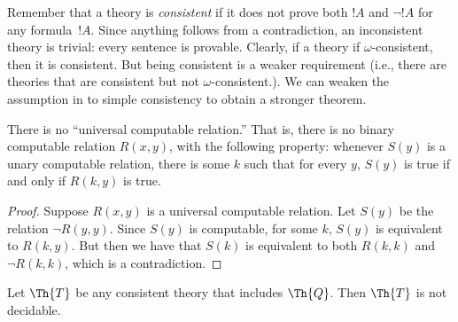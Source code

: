 \documentclass[../../../include/open-logic-section]{subfiles}
\begin{document}

\begin{explain}
Remember that a theory is \emph{consistent} if it does not prove both
$!A$ and $\lnot !A$ for any formula~$!A$. Since anything follows from
a contradiction, an inconsistent theory is trivial: every sentence is
provable. Clearly, if a theory if $\omega$-consistent, then it is
consistent. But being consistent is a weaker requirement (i.e., there
are theories that are consistent but not $\omega$-consistent.). We can
weaken the assumption in  to simple
consistency to obtain a stronger theorem.
\end{explain}

\begin{lem}
There is no ``universal computable relation.'' That is, there is no
binary computable relation $R(x,y)$, with the following property:
whenever $S(y)$ is a unary computable relation, there is some $k$ such
that for every $y$, $S(y)$ is true if and only if $R(k,y)$ is true.
\end{lem}

\begin{proof}
Suppose $R(x,y)$ is a universal computable relation. Let $S(y)$
be the relation $\lnot R(y,y)$. Since $S(y)$ is computable, for some
$k$, $S(y)$ is equivalent to $R(k,y)$. But then we have that $S(k)$ is
equivalent to both $R(k,k)$ and $\lnot R(k,k)$, which is a
contradiction.
\end{proof}


\begin{thm}
Let $\Th{T}$ be any consistent theory that includes $\Th{Q}$. Then
$\Th{T}$ is not decidable.
\end{thm}
\end{document}
